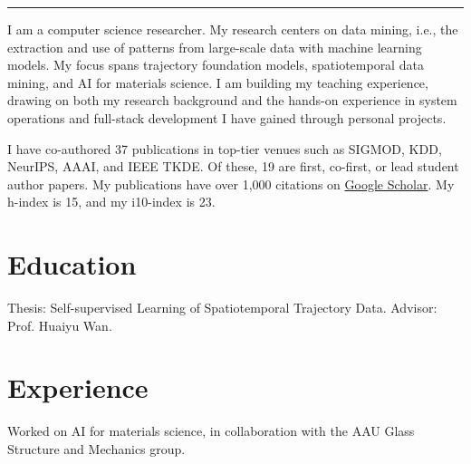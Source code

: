 {\color{rule}\rule{\linewidth}{0.4pt}}

\vspace{\entryskip}
I am a computer science researcher.
My research centers on data mining, i.e., the extraction and use of patterns from large-scale data with machine learning models.
My focus spans trajectory foundation models, spatiotemporal data mining, and AI for materials science.
I am building my teaching experience, drawing on both my research background and the hands-on experience in system operations and full-stack development I have gained through personal projects.

\vspace{\entryskip}
I have co-authored 37 publications in top-tier venues such as SIGMOD, KDD, NeurIPS, AAAI, and IEEE TKDE.
Of these, 19 are first, co-first, or lead student author papers.
My publications have over 1,000 citations on \href{https://scholar.google.com/citations?user=nHMmG2UAAAAJ}{Google Scholar}.
My h-index is 15, and my i10-index is 23.


\section*{Education}

{Thesis: Self-supervised Learning of Spatiotemporal Trajectory Data. Advisor: Prof. Huaiyu Wan.}




\section*{Experience}

{}

{Worked on AI for materials science, in collaboration with the AAU Glass Structure and Mechanics group.}
